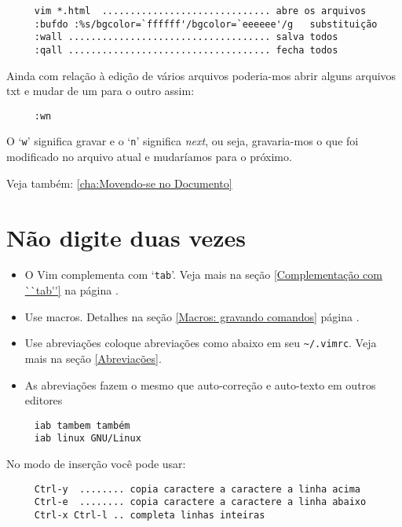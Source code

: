 \begin{verbatim}
     vim *.html  .............................. abre os arquivos
     :bufdo :%s/bgcolor=`ffffff'/bgcolor=`eeeeee'/g   substituição
     :wall .................................... salva todos
     :qall .................................... fecha todos
\end{verbatim}

Ainda com relação à edição de vários arquivos poderia-mos abrir alguns
arquivos txt e mudar de um para o outro assim:

\begin{verbatim}
     :wn
\end{verbatim}

O `{\tt w}' significa gravar e o `{\tt n}' significa {\em next}, ou seja, gravaria-mos
o que foi modificado no arquivo atual e mudaríamos para o próximo.

Veja também: \ref{cha:Movendo-se no Documento}

\section{Não digite duas vezes}
\label{Não digite duas vezes}

\begin{itemize}
\item O Vim complementa com `{\tt tab}'. Veja mais na seção \ref{Complementação com ``tab''} na página \pageref{Complementação com ``tab''}.
\item Use macros. Detalhes na seção \ref{Macros: gravando comandos}
página \pageref{Macros: gravando comandos}.
\item Use abreviações coloque abreviações como abaixo em seu \verb|~/.vimrc|. Veja mais na seção \ref{Abreviações}.
\item As abreviações fazem o mesmo que auto-correção e auto-texto em outros editores
\end{itemize}

\begin{verbatim}
     iab tambem também
     iab linux GNU/Linux
\end{verbatim}

No modo de inserção você pode usar:

\begin{verbatim}
     Ctrl-y  ........ copia caractere a caractere a linha acima
     Ctrl-e  ........ copia caractere a caractere a linha abaixo
     Ctrl-x Ctrl-l .. completa linhas inteiras
\end{verbatim}

